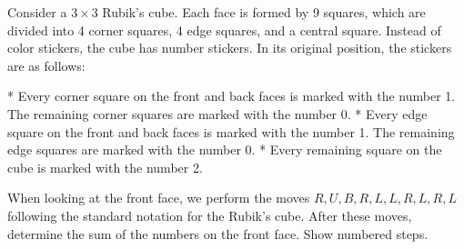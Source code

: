 Consider a $3 \times 3$ Rubik's cube. Each face is formed by 9 squares, which are divided into 4 corner squares, 4 edge squares, and a central square. Instead of color stickers, the cube has number stickers. In its original position, the stickers are as follows:

* Every corner square on the front and back faces is marked with the number 1. The remaining corner squares are marked with the number 0.
* Every edge square on the front and back faces is marked with the number 1. The remaining edge squares are marked with the number 0.
* Every remaining square on the cube is marked with the number 2.

When looking at the front face, we perform the moves $R, U, B, R, L, L, R, L, R, L$ following the standard notation for the Rubik's cube. After these moves, determine the sum of the numbers on the front face. Show numbered steps.
